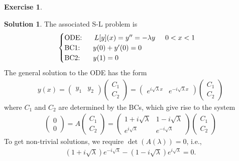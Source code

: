 \documentclass{book}
\theoremstyle{definition}
\newtheorem*{exer*}{Exercise}
\newtheorem*{sln*}{Solution}
\newcommand{\C}{\mathbb{C}}
\begin{document}
\begin{exer*}
\begin{enumerate}
\begin{sln*}
			The associated S-L problem is
			\begin{align*}
			\begin{cases}
			\text{ODE: }\hspace{0.5cm} L[y](x) = y'' = -\lambda y\hspace{0.5cm} 0<x<1\\
			\text{BC1: }\hspace{0.5cm} y(0) + y'(0) = 0\\
			\text{BC2: }\hspace{0.5cm} y(1) = 0
			\end{cases}
			\end{align*}
			The general solution to the ODE has the form
			\begin{align*}
			y(x) = \begin{pmatrix}
			y_1 & y_2
			\end{pmatrix}\begin{pmatrix}
			C_1\\C_2
			\end{pmatrix}= 
			\begin{pmatrix}
			e^{i\sqrt{\lambda}x}&e^{-i\sqrt{\lambda} x}
			\end{pmatrix}
			\begin{pmatrix}
			C_1\\C_2
			\end{pmatrix}
			\end{align*}
			where $C_1$ and $C_2$ are determined by the BCs, which give rise to the system 
			\begin{align*}
			\begin{pmatrix}
			0\\0
			\end{pmatrix} = A\begin{pmatrix}
			C_1\\C_2
			\end{pmatrix} = \begin{pmatrix}
			1 + i\sqrt{\lambda} &  1 -i\sqrt{\lambda}  \\  e^{i\sqrt{\lambda}}  & e^{-i\sqrt{\lambda}} 
			\end{pmatrix}
			\begin{pmatrix}
			C_1\\C_2
			\end{pmatrix}
			\end{align*}	
			To get non-trivial solutions, we require $\det(A(\lambda)) = 0$, i.e., 
			\begin{align*}
			(1+i\sqrt{\lambda})e^{-i\sqrt{\lambda}} - (1-i\sqrt{\lambda})e^{i\sqrt{\lambda}} = 0. 

\end{align*}
\end{sln*}
\end{enumerate}
\end{exer*}
\end{document}
